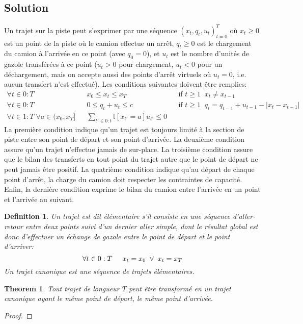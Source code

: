 \documentclass{article}
\newcommand{\carac}[1]{\mathbb{I}[{#1}]}
\newenvironment{solution}{\subsection{Solution}}{\pagebreak}
\newtheorem{definition}{Definition}
\newtheorem{theorem}{Theorem}
\begin{document}
\begin{solution}
Un trajet sur la piste peut s'exprimer par une séquence $(x_t,q_t,u_t)_{t=0}^T$ où $x_t\geq0$ est un point de la piste où le camion effectue un arrêt, $q_t\geq0$ est le chargement du camion à l'arrivée en ce point (avec $q_0=0$), et $u_t$ est le nombre d'unités de gazole transférées à ce point ($u_t>0$ pour chargement, $u_t<0$ pour un déchargement, mais on accepte aussi des points d'arrêt virtuels où $u_t=0$, i.e. aucun transfert n'est effectué). Les conditions suivantes doivent être remplies:
\[
\begin{array}{rclcl}
\forall t\in0:T && x_0\leq x_t\leq x_T&&\textrm{if }t\geq1\;\;x_t\not=x_{t-1}\\
\forall t\in0:T && 0\leq q_t+u_t\leq c&&\textrm{if }t\geq1\;\;q_t = q_{t-1}+u_{t-1}-|x_t-x_{t-1}|\\
\forall t\in1:T\;\forall a\in(x_0,x_T] && \sum_{t'\in0:t}\carac{x_{t'}=a}u_{t'}\leq0&&
\end{array}
\]
La première condition indique qu'un trajet est toujours limité à la section de piste entre son point de départ et son point d'arrivée. La deuxième condition assure qu'un trajet n'effectue jamais de sur-place. La troisième condition assure que le bilan des transferts en tout point du trajet autre que le point de départ ne peut jamais être positif. La quatrième condition indique qu'au départ de chaque point d'arrêt, la charge du camion doit respecter les contraintes de capacité. Enfin, la dernière condition exprime le bilan du camion entre l'arrivée en un point et l'arrivée au suivant.
\begin{definition}
Un trajet est dit {\em élémentaire} s'il consiste en une séquence d'aller-retour entre deux points suivi d'un dernier aller simple, dont le résultat global est donc d'effectuer un échange de gazole entre le point de départ et le point d'arriver:
\[\forall t\in 0:T \hspace{.5cm} x_t=x_0 \;\vee\; x_t=x_T\]
Un trajet {\em canonique} est une séquence de trajets élémentaires.
\end{definition}
\begin{theorem}
Tout trajet de longueur $T$ peut être transformé en un trajet canonique ayant le même point de départ, le même point d'arrivée.
\end{theorem}
\begin{proof}

\end{proof}
\end{solution}
\end{document}
